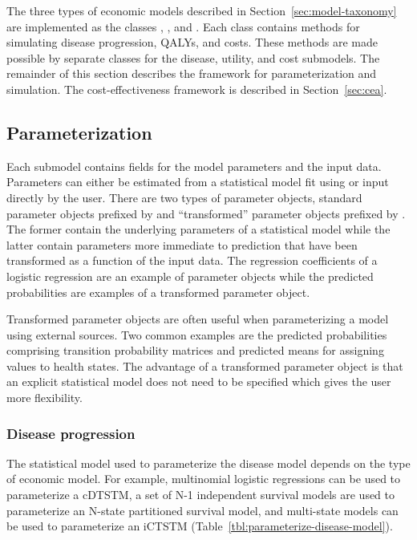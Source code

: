 \documentclass[article, nojss]{jss}\usepackage[]{graphicx}\usepackage[]{color}
\begin{document}
The three types of economic models described in Section~\ref{sec:model-taxonomy} are implemented as the  classes , , and . Each class contains methods for simulating disease progression, QALYs, and costs. These methods are made possible by separate  classes for the disease, utility, and cost submodels. The remainder of this section describes the framework for parameterization and simulation. The cost-effectiveness framework is described in Section~\ref{sec:cea}. 

\subsection{Parameterization} \label{sec:parameterization}
Each submodel contains fields for the model parameters and the input data. Parameters can either be estimated from a statistical model fit using  or input directly by the user. There are two types of parameter objects, standard parameter objects prefixed by  and ``transformed'' parameter objects prefixed by . The former contain the underlying parameters of a statistical model while the latter contain parameters more immediate to prediction that have been transformed as a function of the input data. The regression coefficients of a logistic regression are an example of parameter objects while the predicted probabilities are examples of a transformed parameter object.

Transformed parameter objects are often useful when parameterizing a model using external sources. Two common examples are the predicted probabilities comprising transition probability matrices and predicted means for assigning values to health states. The advantage of a transformed parameter object is that an explicit statistical model does not need to be specified which gives the user more flexibility.

\subsubsection{Disease progression}
The statistical model used to parameterize the disease model depends on the type of economic model. For example, multinomial logistic regressions can be used to parameterize a cDTSTM, a set of N-1 independent survival models are used to parameterize an N-state partitioned survival model, and multi-state models can be used to parameterize an iCTSTM (Table~\ref{tbl:parameterize-disease-model}). 
\end{document}

